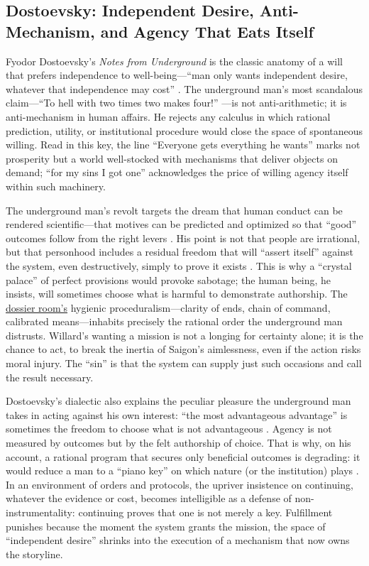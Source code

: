 \subsection*{Dostoevsky: Independent Desire, Anti-Mechanism, and Agency That Eats Itself}
\label{ssec:iii-dostoevsky}
Fyodor Dostoevsky's \emph{Notes from Underground} is the classic anatomy of a will that prefers
independence to well-being—``man only wants independent desire, whatever that independence may
cost'' \parencite[p.~131]{DostoevskyNFU1994}. The underground man's most scandalous claim—``To
hell with two times two makes four!'' \parencite[p.~129]{DostoevskyNFU1994}—is not
anti-arithmetic; it is anti-mechanism in human affairs. He rejects any calculus in which
rational prediction, utility, or institutional procedure would close the space of spontaneous
willing. Read in this key, the line ``Everyone gets everything he wants'' marks not prosperity
but a world well-stocked with mechanisms that deliver objects on demand; ``for my sins I got
one'' acknowledges the price of willing agency itself within such machinery.

The underground man's revolt targets the dream that human conduct can be rendered scientific—that
motives can be predicted and optimized so that ``good'' outcomes follow from the right levers
\parencite[pp.~120--132]{DostoevskyNFU1994}. His point is not that people are irrational, but
that personhood includes a residual freedom that will ``assert itself'' against the system,
even destructively, simply to prove it exists \parencite[pp.~129--132]{DostoevskyNFU1994}.
This is why a ``crystal palace'' of perfect provisions would provoke sabotage; the human being,
he insists, will sometimes choose what is harmful to demonstrate authorship. The
\hyperref[scene:briefing]{dossier room's} hygienic proceduralism—clarity of ends, chain of
command, calibrated means—inhabits precisely the rational order the underground man distrusts.
Willard's wanting a mission is not a longing for certainty alone; it is the chance to act, to
break the inertia of Saigon's aimlessness, even if the action risks moral injury. The ``sin''
is that the system can supply just such occasions and call the result necessary.

Dostoevsky's dialectic also explains the peculiar pleasure the underground man takes in acting
against his own interest: ``the most advantageous advantage'' is sometimes the freedom to choose
what is not advantageous \parencite[pp.~129--131]{DostoevskyNFU1994}. Agency is not measured by
outcomes but by the felt authorship of choice. That is why, on his account, a rational program
that secures only beneficial outcomes is degrading: it would reduce a man to a ``piano key'' on
which nature (or the institution) plays \parencite[pp.~115--120]{DostoevskyNFU1994}.
In an environment of orders and protocols, the upriver insistence on continuing, whatever the
evidence or cost, becomes intelligible as a defense of non-instrumentality: continuing proves
that one is not merely a key. Fulfillment punishes because the moment the system grants the
mission, the space of ``independent desire'' shrinks into the execution of a mechanism that
now owns the storyline.

